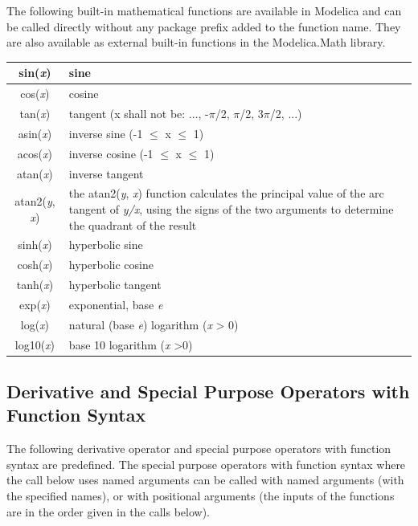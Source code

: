 \documentclass[10pt,a4paper]{report}
\def\doublelabel#1{\label{#1}\hypertarget{#1}{}}
\begin{document}
The following built-in mathematical functions are available in Modelica
and can be called directly without any package prefix added to the
function name. They are also available as external built-in functions in
the Modelica.Math library.

\begin{longtable}{|c|p{8cm}|} \hline
sin(\emph{x}) & sine\\ \hline
cos(\emph{x}) & cosine\\ \hline
tan(\emph{x}) & tangent (x shall not be: ..., -$\pi$/2, $\pi$/2, 3$\pi$/2,
...)\\ \hline
asin(\emph{x}) & inverse sine (-1 $\le$ x $\le$ 1)\\ \hline
acos(\emph{x}) & inverse cosine (-1 $\le$ x $\le$ 1)\\ \hline
atan(\emph{x}) & inverse tangent\\ \hline
atan2(\emph{y}, \emph{x}) & the atan2(\emph{y},
\emph{x}) function calculates the principal value of the arc tangent of
\emph{y/x}, using the signs of the two arguments to
determine the quadrant of the result\\ \hline
sinh(\emph{x}) & hyperbolic sine\\ \hline
cosh(\emph{x}) & hyperbolic cosine\\ \hline
tanh(\emph{x}) & hyperbolic tangent\\ \hline
exp(\emph{x}) & exponential, base \emph{e}\\ \hline
log(\emph{x}) & natural (base \emph{e}) logarithm (\emph{x}
\textgreater{} 0)\\ \hline
log10(\emph{x}) & base 10 logarithm (\emph{x} \textgreater{}0)\\ \hline

\end{longtable}

\subsection{Derivative and Special Purpose Operators with Function Syntax}\doublelabel{derivative-and-special-purpose-operators-with-function-syntax}

The following derivative operator and special purpose operators with
function syntax are predefined. The special purpose operators with
function syntax where the call below uses named arguments can be called
with named arguments (with the specified names), or with positional
arguments (the inputs of the functions are in the order given in the
calls below).
\end{document}

